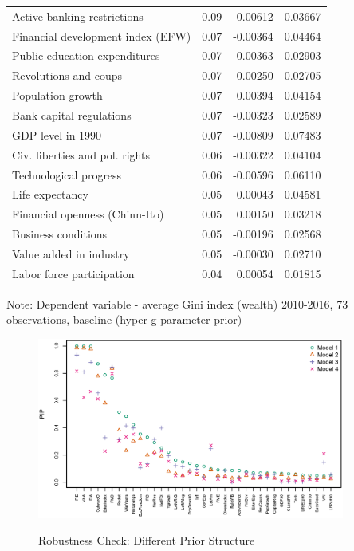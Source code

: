 \documentclass[a4paper,11pt]{article}
\begin{document}
\begin{table}[!ht]
\begin{threeparttable}
\begin{tabular}{lrrr}
  Active banking restrictions & 0.09 & -0.00612 & 0.03667 \\ 
  Financial development index (EFW) & 0.07 & -0.00364 & 0.04464 \\ 
  Public education expenditures & 0.07 & 0.00363 & 0.02903 \\ 
  Revolutions and coups & 0.07 & 0.00250 & 0.02705 \\ 
  Population growth & 0.07 & 0.00394 & 0.04154 \\ 
  Bank capital regulations & 0.07 & -0.00323 & 0.02589 \\ 
  GDP level in 1990 & 0.07 & -0.00809 & 0.07483 \\ 
  Civ. liberties and pol. rights & 0.06 & -0.00322 & 0.04104 \\ 
  Technological progress & 0.06 & -0.00596 & 0.06110 \\ 
  Life expectancy & 0.05 & 0.00043 & 0.04581 \\ 
  Financial openness (Chinn-Ito) & 0.05 & 0.00150 & 0.03218 \\ 
  Business conditions & 0.05 & -0.00196 & 0.02568 \\ 
  Value added in industry & 0.05 & -0.00030 & 0.02710 \\ 
  Labor force participation & 0.04 & 0.00054 & 0.01815 \\ 
  \midrule
  \bottomrule
\end{tabular}
\begin{tablenotes}
\item Note: Dependent variable - average Gini index (wealth) 2010-2016, 73 observations, baseline (hyper-g parameter prior) 
\end{tablenotes}
\end{threeparttable}
\end{table}

\clearpage
\begin{figure}
	\caption{Robustness Check: Different Prior Structure}
	\centering
	\includegraphics[width=0.9\textwidth]{figures/priors_comparison_compound.eps}
	\label{fig:comp_compound}
\end{figure}
\end{document}
